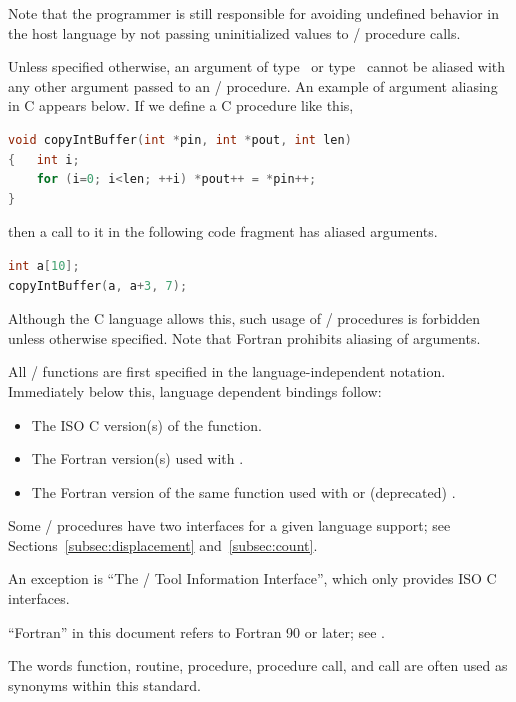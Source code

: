 \begin{users}
Note that the programmer is still responsible for avoiding undefined behavior in the host language by not passing uninitialized values to \mpi/ procedure calls.
\end{users}

Unless specified otherwise, an argument of type \OUT\ or type
\INOUT\ cannot be aliased with any other argument passed to an
\MPI/ procedure.  An example of argument aliasing in C appears below.
If we define a C procedure like this,
\begin{lstlisting}[language=C]
void copyIntBuffer(int *pin, int *pout, int len)
{   int i;
    for (i=0; i<len; ++i) *pout++ = *pin++;
}
\end{lstlisting}
then a call to it in the following code fragment has aliased arguments.
\begin{lstlisting}[language=C]
int a[10];
copyIntBuffer(a, a+3, 7);
\end{lstlisting}
Although the C language allows this, such usage of \MPI/ procedures is
forbidden unless otherwise specified.  Note that Fortran prohibits
aliasing of arguments.

All \MPI/ functions are first specified in the language-independent
notation.  Immediately below this, language dependent bindings follow:
\begin{itemize}
\item The ISO C version(s) of the function.
\item The Fortran version(s) used with .
\item The Fortran version of the same
      function used with  or (deprecated) .
\end{itemize}
Some \MPI/ procedures have two interfaces for a given language support;
see Sections~\ref{subsec:displacement} and~\ref{subsec:count}.

An exception is  ``The \MPI/ Tool Information Interface'',
which only provides ISO C interfaces.

``Fortran'' in this document refers to Fortran 90 or later; see
.

The words function, routine, procedure, procedure call, and call are often used as synonyms within this standard.

